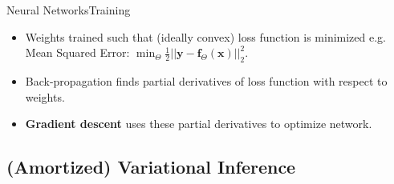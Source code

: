 \documentclass[handout]{beamer}
\begin{document}
\begin{frame}{Neural Networks}{Training}
\begin{itemize}
\item Weights trained such that (ideally convex) loss function is minimized e.g. Mean Squared Error: $\min_\Theta \frac{1}{2}||\bm{y}-\bm{f}_\Theta(\bm{x})||^2_2$.
\vspace{0.5cm}
\item Back-propagation finds partial derivatives of loss function with respect to weights.
\vspace{0.5cm}
\item \textbf{Gradient descent} uses these partial derivatives to optimize network.
\end{itemize}
\end{frame}
\subsection{(Amortized) Variational Inference}
\end{document}
